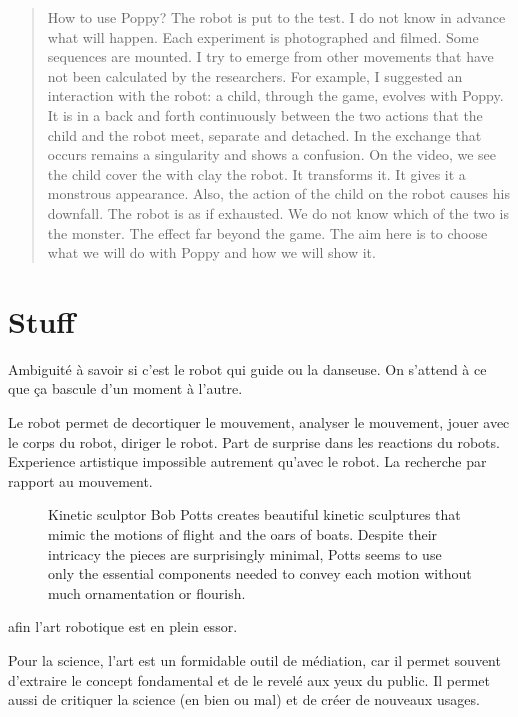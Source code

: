 \begin{quotation}
    How to use Poppy? The robot is put to the test. I do not know in advance what will happen. Each experiment is photographed and filmed. Some sequences are mounted. I try to emerge from other movements that have not been calculated by the researchers. For example, I suggested an interaction with the robot: a child, through the game, evolves with Poppy. It is in a back and forth continuously between the two actions that the child and the robot meet, separate and detached. In the exchange that occurs remains a singularity and shows a confusion. On the video, we see the child cover the with clay the robot. It transforms it. It gives it a monstrous appearance. Also, the action of the child on the robot causes his downfall. The robot is as if exhausted. We do not know which of the two is the monster. The effect far beyond the game. The aim here is to choose what we will do with Poppy and how we will show it.
\end{quotation}


\section*{Stuff} %


Ambiguité à savoir si c'est le robot qui guide ou la danseuse. On s'attend à ce que ça bascule d'un moment à l'autre.

Le robot permet de decortiquer le mouvement, analyser le mouvement, jouer avec le corps du robot, diriger le robot. Part de surprise dans les reactions du robots. Experience artistique impossible autrement qu'avec le robot.
La recherche par rapport au mouvement.

\begin{figure}[]
\centering
    \hfil
    \caption{Kinetic sculptor Bob Potts creates beautiful kinetic sculptures that mimic the motions of flight and the oars of boats. Despite their intricacy the pieces are surprisingly minimal, Potts seems to use only the essential components needed to convey each motion without much ornamentation or flourish.}
    \label{fig:}
\end{figure}


afin l'art robotique est en plein essor.

Pour la science, l'art est un formidable outil de médiation, car il permet souvent d'extraire le concept fondamental et de le revelé aux yeux du public. Il permet aussi de critiquer la science (en bien ou mal) et de créer de nouveaux usages.


